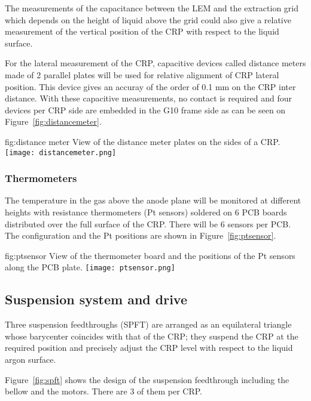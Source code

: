 The  measurements of the capacitance between the LEM and the extraction grid which depends on the height of liquid above the grid could also give a relative measurement  of the vertical position of the CRP with respect to the liquid surface.

For the lateral measurement of the CRP, capacitive devices called distance meters made of 2 parallel plates will be used for relative alignment of  CRP lateral position. This device gives an accuray of the order of 0.1 mm on the CRP inter distance. 
With these capacitive measurements, no contact is required and four devices per CRP side are embedded in the G10 frame side as can be seen on Figure~\ref{fig:distancemeter}.

\begin{dunefigure}{fig:distance meter}
{View of the distance meter plates on the sides of a CRP.}
\texttt{[image: distancemeter.png]}
\end{dunefigure}


\subsubsection{Thermometers}

The temperature in the gas above the anode plane will be monitored at different heights with resistance thermometers (Pt sensors) soldered on  6 PCB boards distributed over the full surface of the CRP.
There will be 6 sensors per PCB. The configuration and the Pt positions are shown in Figure~\ref{fig:ptsensor}.

\begin{dunefigure}{fig:ptsensor}
{View of the thermometer board and the positions of the Pt sensors along the PCB plate.}
\texttt{[image: ptsensor.png]}
\end{dunefigure}
\subsection{Suspension system and drive}
\label{sec:fddp-crp-suspension}
Three suspension feedthroughs (SPFT) are arranged as an equilateral triangle whose barycenter coincides with that of the CRP; they suspend the CRP at the required position and precisely adjust the CRP level with respect to the liquid argon surface.

Figure~\ref{fig:spft} shows the design of the suspension feedthrough including the bellow and the motors. There are 3 of them per CRP.

